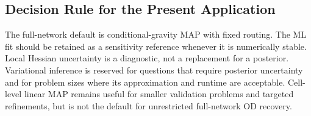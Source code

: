 \subsection{Decision Rule for the Present Application}

The full-network default is conditional-gravity MAP with fixed routing. The ML
fit should be retained as a sensitivity reference whenever it is numerically
stable. Local Hessian uncertainty is a diagnostic, not a replacement for a
posterior. Variational inference is reserved for questions that require
posterior uncertainty and for problem sizes where its approximation and runtime
are acceptable. Cell-level linear MAP remains useful for smaller validation
problems and targeted refinements, but is not the default for unrestricted
full-network OD recovery.
